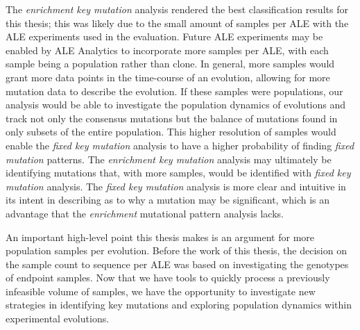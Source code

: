\documentclass[12pt,final,masters,chapterheads]{ucsd}  %
\begin{document}
The \textit{enrichment key mutation} analysis rendered the best classification results for this thesis; this was likely due to the small amount of samples per ALE with the ALE experiments used in the evaluation. Future ALE experiments may be enabled by ALE Analytics to incorporate more samples per ALE, with each sample being a population rather than clone. In general, more samples would grant more data points in the time-course of an evolution, allowing for more mutation data to describe the evolution. If these samples were populations, our analysis would be able to investigate the population dynamics of evolutions and track not only the consensus mutations but the balance of mutations found in only subsets of the entire population. This higher resolution of samples would enable the \textit{fixed key mutation} analysis to have a higher probability of finding \textit{fixed mutation} patterns. The \textit{enrichment key mutation} analysis may ultimately be identifying mutations that, with more samples, would be identified with \textit{fixed key mutation} analysis. The \textit{fixed key mutation} analysis is more clear and intuitive in its intent in describing as to why a mutation may be significant, which is an advantage that the \textit{enrichment} mutational pattern analysis lacks.

An important high-level point this thesis makes is an argument for more population samples per evolution. Before the work of this thesis, the decision on the sample count to sequence per ALE was based on investigating the genotypes of endpoint samples. Now that we have tools to quickly process a previously infeasible volume of samples, we have the opportunity to investigate new strategies in identifying key mutations and exploring population dynamics within experimental evolutions.
\end{document}
